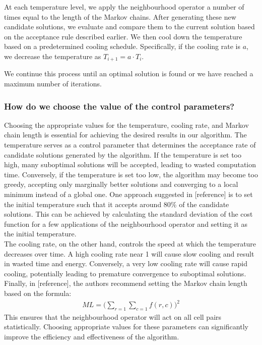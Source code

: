 \documentclass[11pt]{report}
\begin{document}
At each temperature level, we apply the neighbourhood operator a number of times equal to the length of the Markov chains. After generating these new candidate solutions, we evaluate and compare them to the current solution based on the acceptance rule described earlier. We then cool down the temperature based on a predetermined cooling schedule. Specifically, if the cooling rate is $a$, we decrease the temperature as $T_{i+1} = a \cdot T_i$.

We continue this process until an optimal solution is found or we have reached a maximum number of iterations.

\subsubsection{How do we choose the value of the control parameters?}

Choosing the appropriate values for the temperature, cooling rate, and Markov chain length is essential for achieving the desired results in our algorithm. The temperature serves as a control parameter that determines the acceptance rate of candidate solutions generated by the algorithm. If the temperature is set too high, many suboptimal solutions will be accepted, leading to wasted computation time. Conversely, if the temperature is set too low, the algorithm may become too greedy, accepting only marginally better solutions and converging to a local minimum instead of a global one. One approach suggested in [reference] is to set the initial temperature such that it accepts around 80\% of the candidate solutions. This can be achieved by calculating the standard deviation of the cost function for a few applications of the neighbourhood operator and setting it as the initial temperature.
\\

The cooling rate, on the other hand, controls the speed at which the temperature decreases over time. A high cooling rate near 1 will cause slow cooling and result in wasted time and energy. Conversely, a very low cooling rate will cause rapid cooling, potentially leading to premature convergence to suboptimal solutions.
\\

Finally, in [reference], the authors recommend setting the Markov chain length based on the formula:
\begin{align}
ML =\bigg(\sum_{r=1}\sum_{c=1}f(r,c)\bigg)^2
\end{align}
This ensures that the neighbourhood operator will act on all cell pairs statistically. Choosing appropriate values for these parameters can significantly improve the efficiency and effectiveness of the algorithm.
\end{document}
